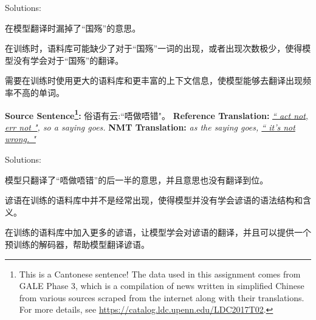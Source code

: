 \begin{parts}
\begin{subparts}
        {\color{red}Solutions:
        
        在模型翻译时漏掉了“国殇”的意思。

        在训练时，语料库可能缺少了对于“国殇”一词的出现，或者出现次数极少，使得模型没有学会对于“国殇”的翻译。

        需要在训练时使用更大的语料库和更丰富的上下文信息，使模型能够去翻译出现频率不高的单词。
        }
        
        \subpart[2] 
        \textbf{Source Sentence\footnote{This is a Cantonese sentence! The data used in this assignment comes from GALE Phase 3, which is a compilation of news written in simplified Chinese from various sources scraped from the internet along with their translations. For more details, see \url{https://catalog.ldc.upenn.edu/LDC2017T02}. }:} 俗语有云:``唔做唔错"。\newline
        \textbf{Reference Translation:} \textit{\underline{`` act not, err not "}, so a saying goes.}\newline
        \textbf{NMT Translation:} \textit{as the saying goes, \underline{`` it's not wrong. "}}
        
        {\color{red}Solutions:
        
        模型只翻译了“唔做唔错”的后一半的意思，并且意思也没有翻译到位。

        谚语在训练的语料库中并不是经常出现，使得模型并没有学会谚语的语法结构和含义。

        在训练的语料库中加入更多的谚语，让模型学会对谚语的翻译，并且可以提供一个预训练的解码器，帮助模型翻译谚语。
        }

    \end{subparts}



\end{parts}
